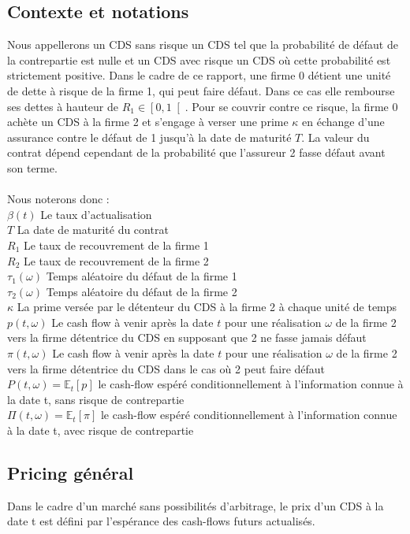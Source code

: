 \documentclass[a4paper]{article}
\begin{document}
\subsection{Contexte et notations}         %
Nous appellerons un CDS sans risque un CDS tel que la probabilité de défaut de la contrepartie est nulle et un CDS avec risque un CDS où cette probabilité est strictement positive.
 Dans le cadre de ce rapport, une firme 0 détient une unité de dette à risque de la firme 1, qui peut faire défaut.
 Dans ce cas elle rembourse ses dettes à hauteur de $R_{1} \in \left[ 0, 1 \right[$.
 Pour se couvrir contre ce risque, la firme 0 achète un CDS à la firme 2 et s'engage à verser une prime $\kappa$ en échange d'une assurance contre le défaut de 1 jusqu'à la date de maturité $T$.
 La valeur du contrat dépend cependant de la probabilité que l'assureur 2 fasse défaut avant son terme.
\\ \\
Nous noterons donc :\\
$\beta (t)$ Le taux d'actualisation\\
$T$ La date de maturité du contrat\\
$R_{1}$ Le taux de recouvrement de la firme 1\\
$R_{2}$ Le taux de recouvrement de la firme 2\\
$\tau_{1} (\omega)$ Temps aléatoire du défaut de la firme 1\\
$\tau_{2} (\omega)$ Temps aléatoire du défaut de la firme 2\\
$\kappa$ La prime versée par le détenteur du CDS à la firme 2 à chaque unité de temps\\
$p (t, \omega)$ Le cash flow à venir après la date $t$ pour une réalisation $\omega$ de la firme 2 vers la firme détentrice du CDS en supposant que 2 ne fasse jamais défaut\\
$\pi (t, \omega)$ Le cash flow à venir après la date $t$ pour une réalisation $\omega$ de la firme 2 vers la firme détentrice du CDS dans le cas où 2 peut faire défaut\\
$P (t, \omega) = \mathbb{E}_{t} [p]$ le cash-flow espéré conditionnellement à l'information connue à la date t, sans risque de contrepartie\\
$\Pi (t, \omega) = \mathbb{E}_{t} [\pi]$ le cash-flow espéré conditionnellement à l'information connue à la date t, avec risque de contrepartie


\subsection{Pricing général}
Dans le cadre d'un marché sans possibilités d'arbitrage, le prix d'un CDS à la date t est défini par l'espérance des cash-flows futurs actualisés.
\end{document}
